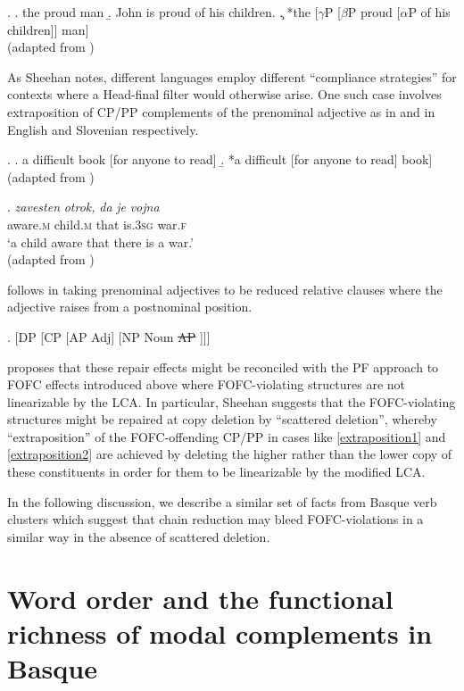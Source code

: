 \documentclass[output=paper]{langscibook}
\begin{document}
\exi. 
\a. the proud man
\b. John is proud of his children.
\c. *the [$\gamma$P [$\beta$P proud [$\alpha$P of his children]] man] \\
(adapted from \cite{williams1982})

As Sheehan notes, different languages employ different ``compliance strategies'' for contexts where a Head-final filter would otherwise arise.  One such case involves  extraposition of CP/PP complements of the prenominal adjective as in \Next and \NNext in English and Slovenian respectively.

\ex. \protect\label{extraposition1}
\a. a difficult book [for anyone to read]
\b. *a difficult [for anyone to read] book] \\
(adapted from \cite{sheehan2012b})

\exg. \protect\label{extraposition2}\textit{zavesten} \textit{otrok,} \textit{da} \textit{je} \textit{vojna} \\
aware.\textsc{m} child.\textsc{m} that is.\textsc{3sg} war.\textsc{f}\\
`a child aware that there is a war.' \\
(adapted from \citep{sheehan2012b})


\cite{sheehan2012b} follows \cite{kayne1994} in taking prenominal adjectives to be reduced relative clauses where the adjective raises from a postnominal position. 

\exi. [DP [CP [AP Adj] [NP Noun \st{AP} ]]]


\cite{sheehan2012b} proposes that these repair effects might be reconciled with the PF approach to FOFC effects introduced above where FOFC-violating structures are not linearizable by the LCA.  In particular, Sheehan  suggests that the FOFC-violating structures might be repaired at copy deletion by ``scattered deletion'', whereby  ``extraposition'' of the FOFC-offending CP/PP in cases like \protect\ref{extraposition1} and \protect\ref{extraposition2} are achieved by deleting the higher rather than the lower copy of these constituents in order for them to be linearizable by the modified LCA.

In the following discussion, we describe a similar set of facts from Basque verb clusters which suggest that chain reduction may bleed FOFC-violations in a similar way in the absence of scattered deletion.
	

\section{Word order and the functional richness of modal complements in Basque}
\end{document}
